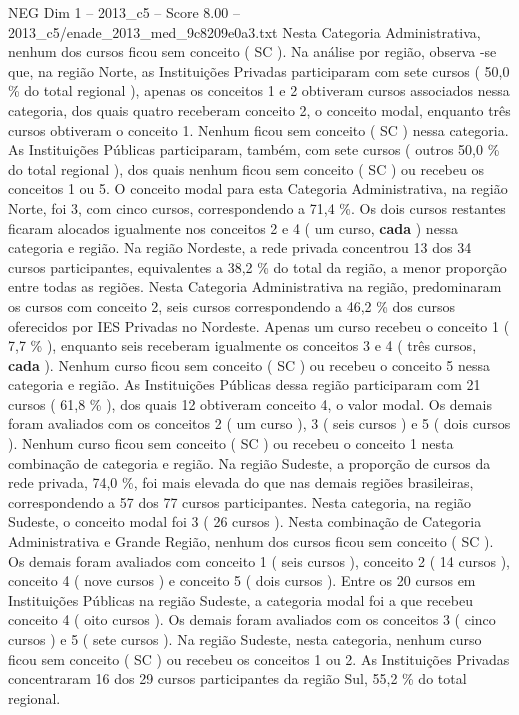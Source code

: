 \begin{textsample}{NEG Dim 1 – 2013\_c5 – Score 8.00 – 2013\_c5/enade\_2013\_med\_9c8209e0a3.txt}
Nesta Categoria Administrativa, nenhum dos cursos ficou sem conceito ( SC ).
Na análise por região, observa -se que, na região Norte, as Instituições Privadas participaram com sete cursos ( 50,0 \% do total regional ), apenas os conceitos 1 e 2 obtiveram cursos associados nessa categoria, dos quais quatro receberam conceito 2, o conceito modal, enquanto três cursos obtiveram o conceito 1.
Nenhum ficou sem conceito ( SC ) nessa categoria.
As Instituições Públicas participaram, também, com sete cursos ( outros 50,0 \% do total regional ), dos quais nenhum ficou sem conceito ( SC ) ou recebeu os conceitos 1 ou 5.
O conceito modal para esta Categoria Administrativa, na região Norte, foi 3, com cinco cursos, correspondendo a 71,4 \%.
Os dois cursos restantes ficaram alocados igualmente nos conceitos 2 e 4 ( um curso, \textbf{cada} ) nessa categoria e região.
Na região Nordeste, a rede privada concentrou 13 dos 34 cursos participantes, equivalentes a 38,2 \% do total da região, a menor proporção entre todas as regiões.
Nesta Categoria Administrativa na região, predominaram os cursos com conceito 2, seis cursos correspondendo a 46,2 \% dos cursos oferecidos por IES Privadas no Nordeste.
Apenas um curso recebeu o conceito 1 ( 7,7 \% ), enquanto seis receberam igualmente os conceitos 3 e 4 ( três cursos, \textbf{cada} ).
Nenhum curso ficou sem conceito ( SC ) ou recebeu o conceito 5 nessa categoria e região.
As Instituições Públicas dessa região participaram com 21 cursos ( 61,8 \% ), dos quais 12 obtiveram conceito 4, o valor modal.
Os demais foram avaliados com os conceitos 2 ( um curso ), 3 ( seis cursos ) e 5 ( dois cursos ).
Nenhum curso ficou sem conceito ( SC ) ou recebeu o conceito 1 nesta combinação de categoria e região.
Na região Sudeste, a proporção de cursos da rede privada, 74,0 \%, foi mais elevada do que nas demais regiões brasileiras, correspondendo a 57 dos 77 cursos participantes.
Nesta categoria, na região Sudeste, o conceito modal foi 3 ( 26 cursos ).
Nesta combinação de Categoria Administrativa e Grande Região, nenhum dos cursos ficou sem conceito ( SC ).
Os demais foram avaliados com conceito 1 ( seis cursos ), conceito 2 ( 14 cursos ), conceito 4 ( nove cursos ) e conceito 5 ( dois cursos ).
Entre os 20 cursos em Instituições Públicas na região Sudeste, a categoria modal foi a que recebeu conceito 4 ( oito cursos ).
Os demais foram avaliados com os conceitos 3 ( cinco cursos ) e 5 ( sete cursos ).
Na região Sudeste, nesta categoria, nenhum curso ficou sem conceito ( SC ) ou recebeu os conceitos 1 ou 2.
As Instituições Privadas concentraram 16 dos 29 cursos participantes da região Sul, 55,2 \% do total regional.

\end{textsample}
